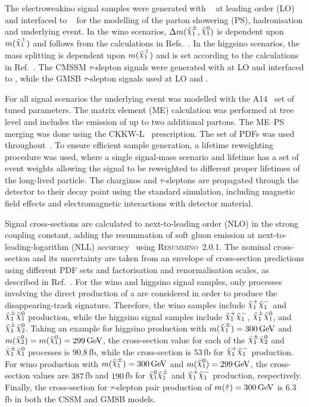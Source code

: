 The electroweakino signal samples were generated with \MGNLO[2.9.9]~\cite{Alwall:2014hca} at leading order (LO) and interfaced to \PYTHIA[8.306]~\cite{Sjostrand:2014zea} for the modelling of the parton showering (PS), hadronisation and underlying event. In the wino scenarios, $\Delta m(\chinoonepm, \ninoone)$ is dependent upon $m(\chinoonepm)$ and follows from the calculations in Refs.~\cite{Giudice:1998xp, Randall:1998uk}. In the higgsino scenarios, the mass splitting is dependent upon $m(\chinoonepm)$ and is set according to the calculations in Ref.~\cite{Nagata:2014wma}. The CMSSM $\tau$-slepton signals were generated with \MGNLO[2.9.5] at LO and interfaced to \PYTHIA[8.306], while the GMSB $\tau$-slepton signals used \MGNLO[2.6.1] at LO and \PYTHIA[8.230].

For all signal scenarios the underlying event was modelled with the A14~\cite{ATL-PHYS-PUB-2014-021} set of tuned parameters. The matrix element (ME) calculation was performed at tree level and includes the emission of up to two additional partons. The ME--PS merging was done using the CKKW-L~\cite{Lonnblad:2012ix} prescription. The \NNPDF[3.0lo] set of PDFs was used throughout~\cite{Ball:2014uwa}. To ensure efficient sample generation, a lifetime reweighting procedure was used, where a single signal-mass scenario and lifetime has a set of event weights allowing the signal to be reweighted to different proper lifetimes of the long-lived particle. The charginos and $\tau$-sleptons are propagated through the detector to their decay point using the standard simulation, including magnetic field effects and electromagnetic interactions with detector material.

Signal cross-sections are calculated to next-to-leading order (NLO) in the strong coupling constant, adding the resummation of soft gluon emission at next-to-leading-logarithm (NLL) accuracy~\cite{Beenakker:1999xh,Debove:2010kf,Fuks:2012qx,Fuks:2013vua,Fiaschi:2018hgm,Bozzi:2007qr,Fuks:2013lya,Fiaschi:2018xdm,newResummino} using \textsc{Resummino}~2.0.1. The nominal cross-section and its uncertainty are taken from an envelope of cross-section predictions using different PDF sets and factorisation and renormalisation scales, as described in Ref.~\cite{Borschensky:2014cia}. For the wino and higgsino signal samples, only processes involving the direct production of a \chinoonepm are considered in order to produce the disappearing-track signature. Therefore, the wino samples include $\chinoonep\chinoonem$ and $\chinoonepm\ninoone$ production, while the higgsino signal samples include $\chinoonep\chinoonem$, $\chinoonepm\ninoone$, and $\chinoonepm\ninotwo$. Taking an example for higgsino production with $m(\chinoonepm) = 300\,\GeV$ and $m(\ninotwo) = m(\ninoone) = 299\,\GeV$, the cross-section value for each of the $\chinoonepm\ninotwo$ and $\chinoonepm\ninoone$ processes is $90.8$\,fb, while the cross-section is $53$\,fb for $\chinoonep\chinoonem$ production.
For wino production with $m(\chinoonepm) = 300\,\GeV$ and $m(\ninoone) = 299\,\GeV$,
the cross-section values are $387$\,fb and $190$\,fb for $\ninoone\chinoonepm$ and $\chinoonep\chinoonem$ production, respectively.
Finally, the cross-section for $\tau$-slepton pair production of $m(\tilde{\tau})= 300\,\text{GeV}$ is $6.3$\,fb in both the CSSM and GMSB models.


